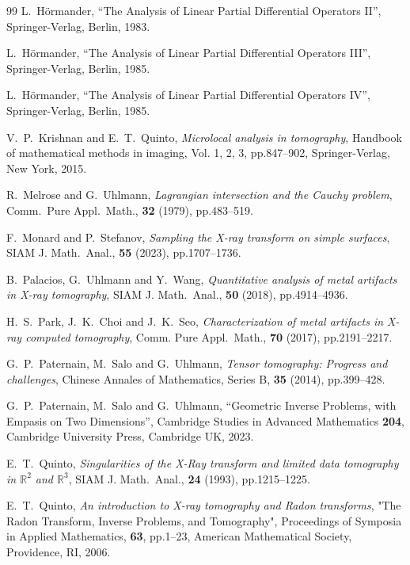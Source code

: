\documentclass[a4paper,11pt,reqno]{amsart}
\numberwithin{equation}{section}
\theoremstyle{definition}
\theoremstyle{remark}
\begin{document}
\begin{thebibliography}{99}
L.~H\"ormander, 
``The Analysis of Linear Partial Differential Operators II'', 
Springer-Verlag, Berlin, 1983. 

L.~H\"ormander, 
``The Analysis of Linear Partial Differential Operators III'', 
Springer-Verlag, Berlin, 1985. 

L.~H\"ormander, 
``The Analysis of Linear Partial Differential Operators IV'', 
Springer-Verlag, Berlin, 1985. 

V.~P.~Krishnan and E.~T.~Quinto, 
{\it Microlocal analysis in tomography}, 
Handbook of mathematical methods in imaging, 
Vol. 1, 2, 3, pp.847--902, Springer-Verlag, New York, 2015.

R.~Melrose and G.~Uhlmann, 
{\it Lagrangian intersection and the Cauchy problem}, 
Comm.\ Pure Appl.\ Math., {\bf 32} (1979), pp.483--519.

F.~Monard and P.~Stefanov, 
{\it Sampling the X-ray transform on simple surfaces}, 
SIAM J. Math.\ Anal., {\bf 55} (2023), pp.1707--1736.

B.~Palacios, G.~Uhlmann and Y.~Wang, 
{\it Quantitative analysis of metal artifacts in X-ray tomography}, 
SIAM J. Math.\ Anal., {\bf 50} (2018), pp.4914--4936. 

H.~S.~Park, J.~K.~Choi and J.~K.~Seo, 
{\it Characterization of metal artifacts in X-ray computed tomography}, 
Comm. Pure Appl.\ Math., {\bf 70} (2017), pp.2191--2217.

G.~P.~Paternain, M.~Salo and G.~Uhlmann, 
{\it Tensor tomography: Progress and challenges}, 
Chinese Annales of Mathematics, Series B, {\bf 35} (2014), pp.399--428.

G.~P.~Paternain, M.~Salo and G.~Uhlmann, 
``Geometric Inverse Problems, with Empasis on Two Dimensions'', 
Cambridge Studies in Advanced Mathematics {\bf 204}, 
Cambridge University Press, Cambridge UK, 2023.

E.~T.~Quinto, 
{\it Singularities of the X-Ray transform and limited data tomography in $\mathbb{R}^2$ and $\mathbb{R}^3$}, 
SIAM J. Math.\ Anal., {\bf 24} (1993), pp.1215--1225. 

E.~T.~Quinto, 
{\it An introduction to X-ray tomography and Radon transforms}, 
"The Radon Transform, Inverse Problems, and Tomography", 
Proceedings of Symposia in Applied Mathematics, {\bf 63}, pp.1--23, 
American Mathematical Society, Providence, RI, 2006.


\end{thebibliography}
\end{document}
